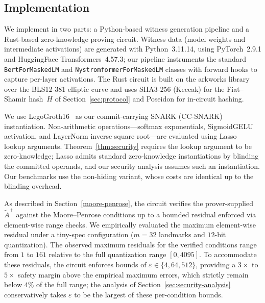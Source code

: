 \documentclass[runningheads]{llncs}
\begin{document}
\subsection{Implementation}
We implement \name in two parts: a Python-based witness generation pipeline and a Rust-based zero-knowledge proving circuit. Witness data (model weights and intermediate activations) are generated with Python~3.11.14, using PyTorch~2.9.1 and HuggingFace Transformers~4.57.3; our pipeline instruments the standard \texttt{BertForMaskedLM} and \texttt{NystromformerForMaskedLM} classes with forward hooks to capture per-layer activations. The Rust circuit is built on the arkworks library over the BLS12-381 elliptic curve and uses SHA3-256 (Keccak) for the Fiat--Shamir hash~$H$ of Section~\ref{sec:protocol} and Poseidon for in-circuit hashing.

We use LegoGroth16~\cite{Legosnark} as our commit-carrying SNARK (CC-SNARK) instantiation.  Non-arithmetic operations---softmax exponentials, SigmoidGELU activation, and LayerNorm inverse square root---are evaluated using Lasso~\cite{Lasso} lookup arguments. Theorem~\ref{thm:security} requires the lookup argument to be zero-knowledge; Lasso admits standard zero-knowledge instantiations by blinding the committed operands, and our security analysis assumes such an instantiation. Our benchmarks use the non-hiding variant, whose costs are identical up to the blinding overhead.

\label{subsec:pseudoinverse}
As described in Section~\ref{moore-penrose}, the circuit verifies the prover-supplied $\tilde{A}^{+}$ against the Moore--Penrose conditions up to a bounded residual enforced via element-wise range checks.
We empirically evaluated the maximum element-wise residual under a tiny-spec configuration ($m{=}32$ landmarks and $12$-bit quantization).
The observed maximum residuals for the verified conditions range from $1$ to $161$ relative to the full quantization range $[0, 4095]$.
To accommodate these residuals, the circuit enforces bounds of $\varepsilon \in \{4, 64, 512\}$, providing a $3\times$ to $5\times$ safety margin above the empirical maximum errors, which strictly remain below $4\%$ of the full range; the analysis of Section~\ref{sec:security-analysis} conservatively takes $\varepsilon$ to be the largest of these per-condition bounds.
\end{document}
